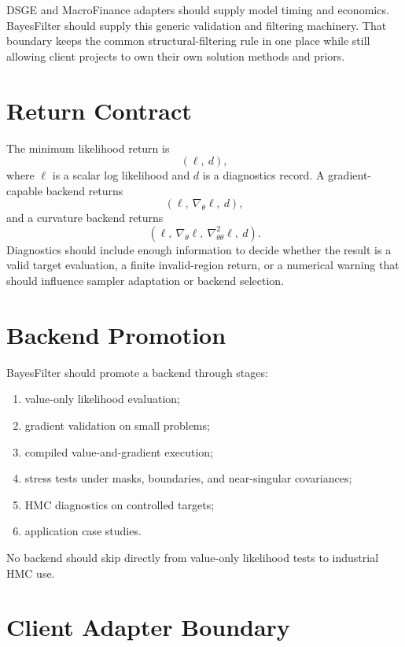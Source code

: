 DSGE and MacroFinance adapters should supply model timing and economics.
BayesFilter should supply this generic validation and filtering machinery.
That boundary keeps the common structural-filtering rule in one place while
still allowing client projects to own their own solution methods and priors.

\section{Return Contract}
\label{sec:bf-api-return-contract}

The minimum likelihood return is
\[
  (\ell,\ d),
\]
where $\ell$ is a scalar log likelihood and $d$ is a diagnostics record.  A
gradient-capable backend returns
\[
  (\ell,\ \nabla_\theta \ell,\ d),
\]
and a curvature backend returns
\[
  (\ell,\ \nabla_\theta \ell,\ \nabla^2_{\theta\theta}\ell,\ d).
\]
Diagnostics should include enough information to decide whether the result is a
valid target evaluation, a finite invalid-region return, or a numerical warning
that should influence sampler adaptation or backend selection.

\section{Backend Promotion}
\label{sec:bf-api-backend-promotion}

BayesFilter should promote a backend through stages:
\begin{enumerate}[label=(\roman*)]
  \item value-only likelihood evaluation;
  \item gradient validation on small problems;
  \item compiled value-and-gradient execution;
  \item stress tests under masks, boundaries, and near-singular covariances;
  \item HMC diagnostics on controlled targets;
  \item application case studies.
\end{enumerate}
No backend should skip directly from value-only likelihood tests to industrial
HMC use.

\section{Client Adapter Boundary}
\label{sec:bf-api-client-adapter-boundary}

